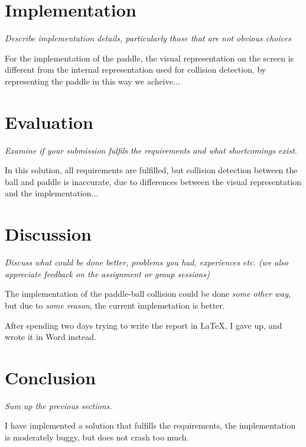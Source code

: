 \documentclass[11pt]{article}
\begin{document}
\section{Implementation}

\emph{Describe implementation details, particularly those that are not obvious choices}

For the implementation of the paddle, the visual representation on the screen is different from the internal representation used for collision detection, by representing the paddle in this way we acheive...


\section{Evaluation}

\emph{Examine if your submission fulfils the requirements and what shortcomings exist.}

In this solution, all requirements are fulfilled, but collision detection between the ball and paddle is inaccurate, due to differences between the visual representation and the implementation...

\section{Discussion}

\emph{Discuss what could be done better, problems you had, experiences etc. (we also appreciate feedback on the assignment or group sessions) }

The implementation of the paddle-ball collision could be done \emph{some other way}, but due to \emph{some reason}, the current implemetation is better.

After spending two days trying to write the report in \LaTeX, I gave up, and wrote it in Word instead.

\section{Conclusion}

\emph{Sum up the previous sections.}

I have implemented a solution that fulfills the requirements, the implementation is moderately buggy, but does not crash too much.




\end{document}
